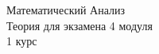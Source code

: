 \documentclass[11pt,a4paper]{article}
\begin{document}
\begin{center}

\begin{huge}
\textsf{Математический Анализ\\Теория для экзамена 4 модуля\\1 курс}
\end{huge}

\vspace{5mm}

\end{center}
\end{document}
